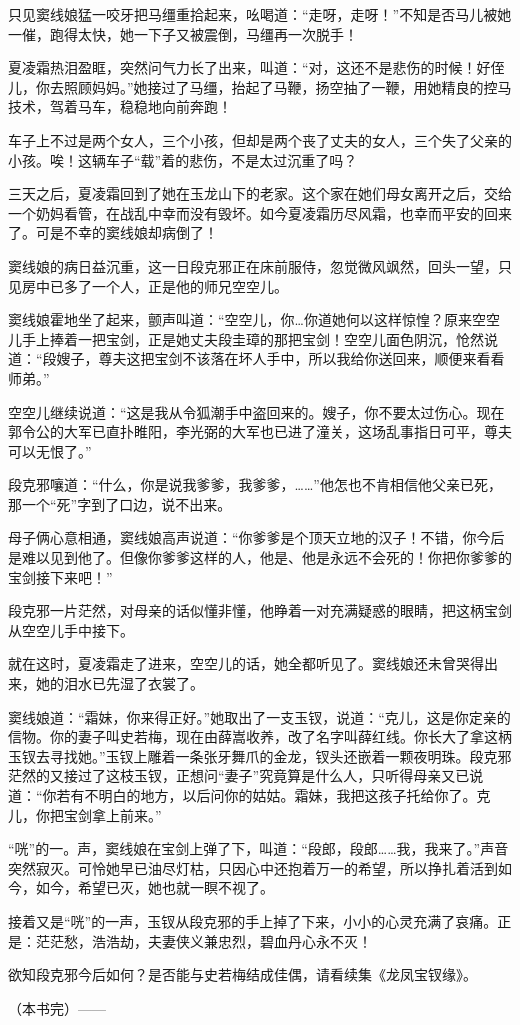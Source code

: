 \documentclass[12pt,oneside]{book}
\begin{document}
只见窦线娘猛一咬牙把马缰重拾起来，吆喝道：``走呀，走呀！''不知是否马儿被她一催，跑得太快，她一下子又被震倒，马缰再一次脱手！

夏凌霜热泪盈眶，突然问气力长了出来，叫道：``对，这还不是悲伤的时候！好侄儿，你去照顾妈妈。''她接过了马缰，抬起了马鞭，扬空抽了一鞭，用她精良的控马技术，驾着马车，稳稳地向前奔跑！

车子上不过是两个女人，三个小孩，但却是两个丧了丈夫的女人，三个失了父亲的小孩。唉！这辆车子``载''着的悲伤，不是太过沉重了吗？

三天之后，夏凌霜回到了她在玉龙山下的老家。这个家在她们母女离开之后，交给一个奶妈看管，在战乱中幸而没有毁坏。如今夏凌霜历尽风霜，也幸而平安的回来了。可是不幸的窦线娘却病倒了！

窦线娘的病日益沉重，这一日段克邪正在床前服侍，忽觉微风飒然，回头一望，只见房中已多了一个人，正是他的师兄空空儿。

窦线娘霍地坐了起来，颤声叫道：``空空儿，你\ldots 你道她何以这样惊惶？原来空空儿手上捧着一把宝剑，正是她丈夫段圭璋的那把宝剑！空空儿面色阴沉，怆然说道：``段嫂子，尊夫这把宝剑不该落在坏人手中，所以我给你送回来，顺便来看看师弟。''

空空儿继续说道：``这是我从令狐潮手中盗回来的。嫂子，你不要太过伤心。现在郭令公的大军已直扑睢阳，李光弼的大军也已进了潼关，这场乱事指日可平，尊夫可以无恨了。''

段克邪嚷道：``什么，你是说我爹爹，我爹爹，\ldots\ldots{}''他怎也不肯相信他父亲已死，那一个``死''字到了口边，说不出来。

母子俩心意相通，窦线娘高声说道：``你爹爹是个顶天立地的汉子！不错，你今后是难以见到他了。但像你爹爹这样的人，他是、他是永远不会死的！你把你爹爹的宝剑接下来吧！''

段克邪一片茫然，对母亲的话似懂非懂，他睁着一对充满疑惑的眼睛，把这柄宝剑从空空儿手中接下。

就在这时，夏凌霜走了进来，空空儿的话，她全都听见了。窦线娘还未曾哭得出来，她的泪水已先湿了衣裳了。

窦线娘道：``霜妹，你来得正好。''她取出了一支玉钗，说道：``克儿，这是你定亲的信物。你的妻子叫史若梅，现在由薛嵩收养，改了名字叫薛红线。你长大了拿这柄玉钗去寻找她。''玉钗上雕着一条张牙舞爪的金龙，钗头还嵌着一颗夜明珠。段克邪茫然的又接过了这枝玉钗，正想问``妻子''究竟算是什么人，只听得母亲又已说道：``你若有不明白的地方，以后问你的姑姑。霜妹，我把这孩子托给你了。克儿，你把宝剑拿上前来。''

``咣''的一。声，窦线娘在宝剑上弹了下，叫道：``段郎，段郎\ldots\ldots 我，我来了。''声音突然寂灭。可怜她早已油尽灯枯，只因心中还抱着万一的希望，所以挣扎着活到如今，如今，希望已灭，她也就一瞑不视了。

接着又是``咣''的一声，玉钗从段克邪的手上掉了下来，小小的心灵充满了哀痛。正是：茫茫愁，浩浩劫，夫妻侠义兼忠烈，碧血丹心永不灭！

欲知段克邪今后如何？是否能与史若梅结成佳偶，请看续集《龙凤宝钗缘》。

（本书完）------


\backmatter
\end{document}
